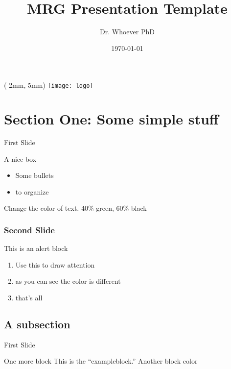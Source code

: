 \documentclass{beamer}
\title{MRG Presentation Template}
\author{Dr. Whoever PhD}
\institute{Metrum Research Group}
\date{\today}
\begin{document}
\begin{frame}
\begin{textblock*}{80mm}(-2mm,-5mm)
\texttt{[image: logo]}
\end{textblock*}
\titlepage

\end{frame}

\begin{frame}
\tableofcontents
\end{frame}

\section{Section One: Some simple stuff}
\begin{frame}{First Slide}

\begin{block}{A nice box}
\begin{itemize}
\item Some bullets
\item to organize
\end{itemize}
\end{block}

{\color{green!40!black} Change the color of text. 40\% green, 60\% black}
\end{frame}

\begin{frame}
\frametitle{Second Slide}
\begin{alertblock}{This is an alert block}
\begin{enumerate}
\item Use this to draw attention
\item as you can see the color is different
\item that's all
\end{enumerate}
\end{alertblock}

\end{frame}

\subsection{A subsection}
\begin{frame}{First Slide}
\begin{exampleblock}{One more block}
This is the ``exampleblock.'' Another block color
\end{exampleblock}
\end{frame}
\end{document}
